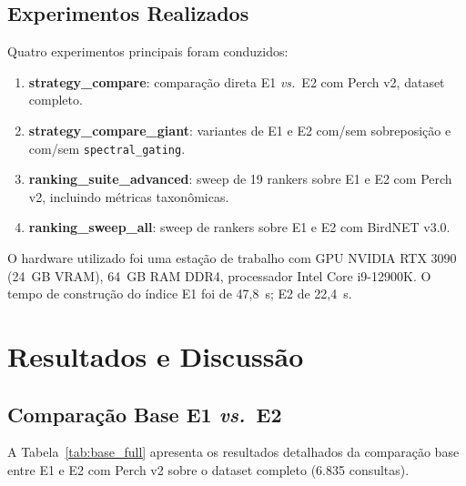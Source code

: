 \documentclass[12pt,a4paper]{article}
\begin{document}
\subsection{Experimentos Realizados}

Quatro experimentos principais foram conduzidos:

\begin{enumerate}
  \item \textbf{strategy\_compare}: comparação direta E1 \emph{vs.}\ E2 com
  Perch v2, dataset completo.
  \item \textbf{strategy\_compare\_giant}: variantes de E1 e E2 com/sem
  sobreposição e com/sem \texttt{spectral\_gating}.
  \item \textbf{ranking\_suite\_advanced}: sweep de 19 rankers sobre E1 e E2
  com Perch v2, incluindo métricas taxonômicas.
  \item \textbf{ranking\_sweep\_all}: sweep de rankers sobre E1 e E2 com
  BirdNET v3.0.
\end{enumerate}

O hardware utilizado foi uma estação de trabalho com GPU NVIDIA RTX 3090 (24~GB
VRAM), 64~GB RAM DDR4, processador Intel Core i9-12900K. O tempo de construção
do índice E1 foi de 47,8~s; E2 de 22,4~s.

\section{Resultados e Discussão}
\label{sec:resultados}

\subsection{Comparação Base E1 \emph{vs.}\ E2}

A Tabela~\ref{tab:base_full} apresenta os resultados detalhados da comparação
base entre E1 e E2 com Perch v2 sobre o dataset completo (6.835 consultas).
\end{document}
